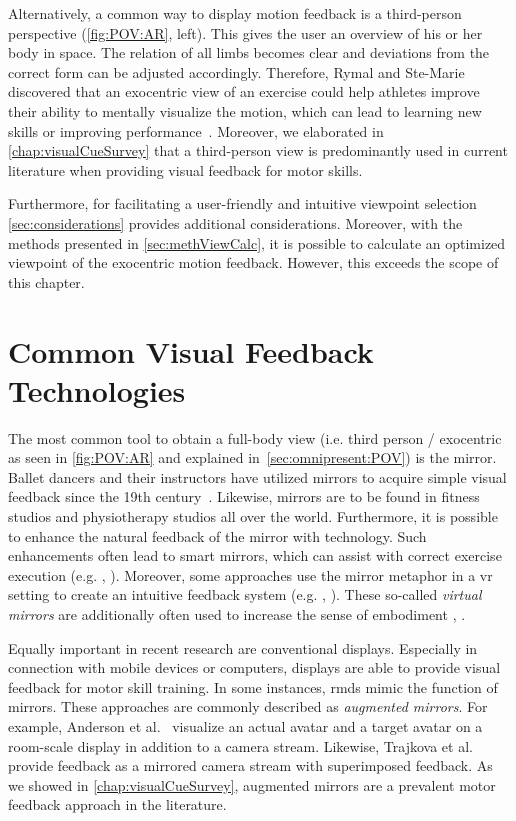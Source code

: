 Alternatively, a common way to display motion feedback is a third-person perspective (\autoref{fig:POV:AR}, left). This gives the user an overview of his or her body in space. The relation of all limbs becomes clear and deviations from the correct form can be adjusted accordingly. Therefore, Rymal and Ste-Marie~\cite{rymal2009dsm} discovered that an exocentric view of an exercise could help athletes improve their ability to mentally visualize the motion, which can lead to learning new skills or improving performance~\cite{white1998ida}. Moreover, we elaborated in \autoref{chap:visualCueSurvey} that a third-person view is predominantly used in current literature when providing visual feedback for motor skills.

Furthermore, for facilitating a user-friendly and intuitive viewpoint selection \autoref{sec:considerations} provides additional considerations. Moreover, with the methods presented in \autoref{sec:methViewCalc}, it is possible to calculate an optimized viewpoint of the exocentric motion feedback. However, this exceeds the scope of this chapter.

\section{Common Visual Feedback Technologies} %
The most common tool to obtain a full-body view (i.e. third person / exocentric as seen in \autoref{fig:POV:AR} and explained in~\autoref{sec:omnipresent:POV}) is the mirror. Ballet dancers and their instructors have utilized mirrors to acquire simple visual feedback since the 19th century~\cite{desmond1997mim}. Likewise, mirrors are to be found in fitness studios and physiotherapy studios all over the world. Furthermore, it is possible to enhance the natural feedback of the mirror with technology. Such enhancements often lead to smart mirrors, which can assist with correct exercise execution (e.g. \cite{kim2020rtm}, \cite{park2021ued}). Moreover, some approaches use the mirror metaphor in a \acrshort{vr} setting to create an intuitive feedback system (e.g. \cite{waltemate2016tlp}, \cite{huelsmann2019ssp}). These so-called \emph{virtual mirrors} are additionally often used to increase the sense of embodiment \cite{inoue2021virtual}, \cite{gonzalesfranco2010contribution}.

Equally important in recent research are conventional displays. Especially in connection with mobile devices or computers, displays are able to provide visual feedback for motor skill training. In some instances, \acrshort{rmd}s mimic the function of mirrors. These approaches are commonly described as \emph{augmented mirrors}. For example, Anderson et al.~\cite{anderson2013youmove} visualize an actual avatar and a target avatar on a room-scale display in addition to a camera stream. Likewise, Trajkova et al.~\cite{trajkova2018ttb} provide feedback as a mirrored camera stream with superimposed feedback. As we showed in \autoref{chap:visualCueSurvey}, augmented mirrors are a prevalent motor feedback approach in the literature. 

